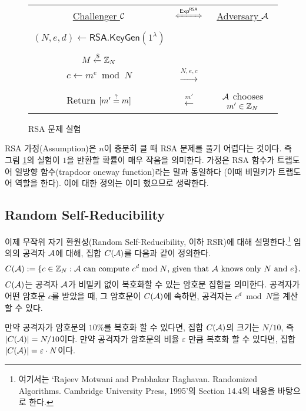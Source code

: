 \begin{figure}[ht]
    \begin{tcolorbox}[colback=white]
        \centering
        \begin{tabularx}{\linewidth}{CcC}
            \underline{Challenger $\mathcal{C}$} & $\xLeftrightarrow{\EXP^{\RSA}}$ & \underline{Adversary $\mathcal{A}$} \\
            \\
            $(N, e, d) \gets \textsf{RSA.KeyGen}(1^{\lambda})$ & & \\
            \\
            $M \xleftarrow{\$} \mathbb{Z}_N$ & & \\
            $c \gets m^e \bmod N$ & $\xrightarrow{N, e, c}$ & \\
            \\
            Return $[m' \overset{?}{=} m]$ & $\xleftarrow{m'}$ & $\mathcal{A}$ chooses $m' \in \mathbb{Z}_N$ \\
        \end{tabularx}
    \end{tcolorbox}
    \caption{RSA 문제 실험}
    \label{fig:rsa-problem}
\end{figure}

RSA 가정(Assumption)은 $n$이 충분히 클 때 RSA 문제를 풀기 어렵다는 것이다. 즉
그림 \ref{fig:rsa-problem}의 실험이 $1$을 반환할 확률이 매우 작음을 의미한다.
가정은 RSA 함수가 트랩도어 일방향 함수(trapdoor oneway function)라는 말과
동일하다 (이때 비밀키가 트랩도어 역할을 한다). 이에 대한 정의는 이미 했으므로
생략한다.

\subsection{Random Self-Reducibility}

이제 무작위 자기 환원성(Random Self-Reducibility, 이하 RSR)에 대해
설명한다.\footnote{여기서는 `Rajeev Motwani and Prabhakar Raghavan. Randomized
Algorithms. Cambridge University Press, 1995'의 Section 14.4의 내용을 바탕으로
한다.} 임의의 공격자 $\mathcal{A}$에 대해, 집합 $C(\mathcal{A})$를 다음과 같이 정의한다.
$$
    C(\mathcal{A}) := \{ c \in \mathbb{Z}_N : \mathcal{A} \text{ can compute $c^d \bmod N$, given that $\mathcal{A}$ knows only $N$ and $e$} \}.
$$
$C(\mathcal{A})$는 공격자 $\mathcal{A}$가 비밀키 없이 복호화할 수 있는 암호문 집합을 의미한다.
공격자가 어떤 암호문 $c$를 받았을 때, 그 암호문이 $C(\mathcal{A})$에 속하면, 공격자는
$c^d \bmod N$을 계산할 수 있다.

만약 공격자가 암호문의 $10\%$를 복호화 할 수 있다면, 집합 $C(\mathcal{A})$의 크기는
$N/10$, 즉 $|C(\mathcal{A})| = N/10$이다. 만약 공격자가 암호문의 비율 $\varepsilon$ 만큼
복호화 할 수 있다면, 집합 $|C(\mathcal{A})| = \varepsilon \cdot N$이다.


